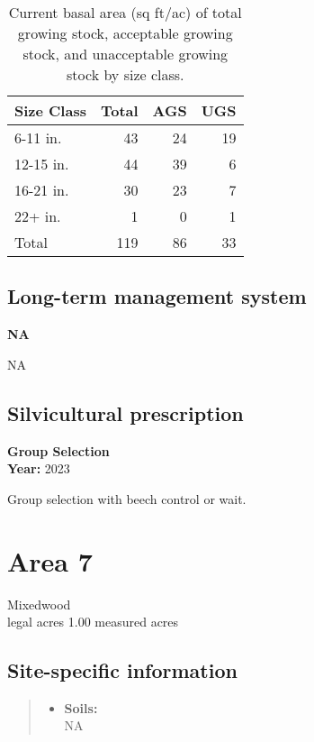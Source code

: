 \documentclass[]{tufte-handout}
\providecommand{\tightlist}{%
  \setlength{\itemsep}{0pt}\setlength{\parskip}{0pt}}
\begin{document}
\begin{table}

\caption{\label{tab:unnamed-chunk-37}Current basal area (sq ft/ac) of total growing stock, acceptable growing stock, and unacceptable growing stock by size class.}
\centering
\begin{tabular}[t]{lrrr}
\toprule
Size Class & Total & AGS & UGS\\
\midrule
6-11 in. & 43 & 24 & 19\\
12-15 in. & 44 & 39 & 6\\
16-21 in. & 30 & 23 & 7\\
22+ in. & 1 & 0 & 1\\
Total & 119 & 86 & 33\\
\bottomrule
\end{tabular}
\end{table}

\subsection{Long-term management
system}\label{long-term-management-system-5}

\textbf{NA}

NA

\subsection{Silvicultural
prescription}\label{silvicultural-prescription-5}

\textbf{Group Selection}\\
\noindent \textbf{Year:} 2023

Group selection with beech control or wait.

\newpage

\section{Area 7}\label{area-7}

Mixedwood\\
 legal acres \textbar{} 1.00 measured acres

\subsection{Site-specific
information}\label{site-specific-information-6}

\begin{quote}
\begin{itemize}
\tightlist
\item
  \textbf{Soils:}\\
  \indent\indent  NA
\end{itemize}
\end{quote}
\end{document}
